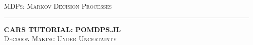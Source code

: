 
\begin{frame}[plain,c]{}

\begin{center}
\LARGE \textsc{MDPs: Markov Decision Processes}
\textcolor[RGB]{100,100,100}{\rule{\linewidth}{0.2pt}}

{\color{cardinal}\textbf{\Large{CARS} \Large{T}\normalsize{UTORIAL}: \Large{POMDP}\normalsize{S.JL}}}\\
{\normalsize\textsc{Decision Making Under Uncertainty}}

\end{center}

\end{frame}


